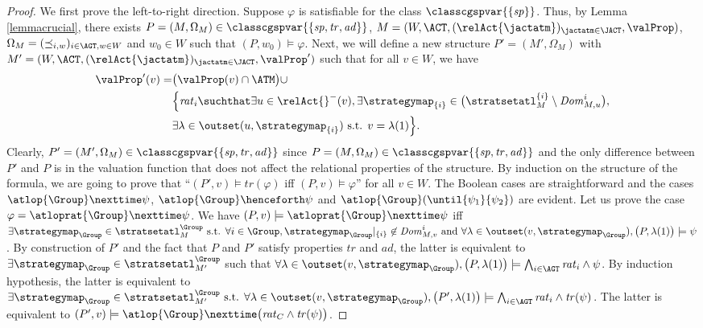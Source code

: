 \begin{proof} 
We first prove the left-to-right direction. Suppose $\varphi$
is satisfiable for the class $\classcgspvar{\{\mathit{sp} \}}$.
Thus, by Lemma
\ref{lemmacrucial},
there exists 
$P=(M,\Omega_{M}) \in
\classcgspvar{\{ \mathit{sp},\mathit{tr},\mathit{ad}  \}} $, 
 $M = ( W,  \ACT,  (\relAct{\jactatm}   )_{\jactatm \in \JACT}, 
  \valProp  )$,
  $\Omega_{M }=(\preceq_{i,w }   )_{i \in \AGT, w \in W }$
  and $w_0 \in W $
  such that $(P,w_0 )\models \varphi $. 
  Next, we will define a new structure
  $P'=(M',\Omega_{M})   $
with
 $M' = ( W,  \ACT,  \allowbreak (\relAct{\jactatm}  )_{\jactatm \in \JACT}, \allowbreak
  \valProp ' )$
  such that  for all $ v\in W$,
  we have 
  \begin{align*}
\valProp '(v)= &
   \big(\valProp (v)\cap \ATM\big) 
   \cup \\
   & \Big\{ \mathit{rat}_i
   \suchthat 
        \exists  u \in \relAct{ }^-( v),
     \exists \strategymap_{\{i\}} \in  \big( \stratsetatl^{\{i\}}_{M} 
     \setminus \mathit{Dom}_{M,u}^i
     \big),
     \\ &
     \exists 
        \lambda 
    \in \outset(u,      \strategymap_{\{i\}} )
     \text{ s.t. }
    v=  \lambda(1)
   \Big\}.      
  \end{align*}
Clearly, 
    $P'=(M',\Omega_{M}) \in
\classcgspvar{\{ \mathit{sp},\mathit{tr},\mathit{ad}  \}} $
since 
$P=(M,\Omega_{M}) \in
\classcgspvar{\{ \mathit{sp},\mathit{tr},\mathit{ad}  \}} $
and the only difference between $P'$
and $P$
is in the valuation function 
that  does not affect the relational properties
of the structure. 
By induction on the structure of the formula,
we are going to prove that 
``$(P',v )\models \mathit{tr}( \varphi )$ iff
  $(P,v )\models \varphi $'' for all $v \in W$.
  The Boolean cases 
  are straightforward 
  and the cases $  \atlop{\Group}
\nexttime \psi $,
$\atlop{\Group}
\henceforth \psi $
and $\atlop{\Group}
(\until{\psi_1}{\psi_2 })$
   are evident. 
Let us prove the case 
$\varphi= \atloprat{\Group}
\nexttime \psi  $.
We have 
$(P,v )\models \atloprat{\Group}
\nexttime \psi $ 
iff 
$\exists \strategymap_\Group \in  \stratsetatl^\Group_{M}
  \text{ s.t. }
  \forall i \in \Group, \strategymap_\Group|_{\{i\}}\not \in \mathit{Dom}_{M ,v }^i \text{ and } \forall \lambda \in \outset(v, \strategymap_\Group), \allowbreak 
\big( P , \lambda(1)  \big)\models \psi  $.
By construction of $P'$ and the fact that
$P$
and $P'$
satisfy  properties $\mathit{tr}$ and $\mathit{ad }$,
the latter is equivalent to $\exists \strategymap_\Group \in  \stratsetatl^\Group_{M' }
 $ such that $\forall \lambda \in \outset(v, \strategymap_\Group), \allowbreak
\big( P , \lambda(1)  \big)\models 
\bigwedge_{i \in \AGT }\mathit{rat}_i \wedge \psi $. 
By induction hypothesis,
the latter is equivalent to 
$\exists \strategymap_\Group \in  \stratsetatl^\Group_{M'}
  \text{ s.t. }\forall \lambda \in \outset(v, \strategymap_\Group),
\big( P' , \lambda(1)  \big)\models 
\bigwedge_{i \in \AGT }\mathit{rat}_i \wedge \mathit{tr}(\psi)  $. 
The latter is equivalent to
$(P',v )\models \atlop{\Group}
\nexttime \big(\mathit{rat}_C \allowbreak \wedge \mathit{tr}(\psi)  \big)  $.  



\end{proof}
